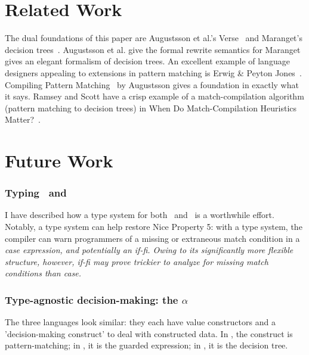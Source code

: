 \documentclass[manuscript,screen,review, 12pt, nonacm]{acmart}
\begin{document}
    \section{Related Work}

    The dual foundations of this paper are Augustsson et al.'s
    Verse~\citep{verse} and Maranget's decision trees~\citep{maranget}.
    Augustsson et al. give the formal rewrite semantics for \VC\; Maranget gives
    an elegant formalism of decision trees. An excellent example of language
    designers appealing to extensions in pattern matching is Erwig \&
    Peyton Jones~\citep{guardproposal}. Compiling Pattern
    Matching~\citep{augustsson1985compiling} by Augustsson gives a foundation in
    exactly what it says. Ramsey and Scott have a crisp example of a
    match-compilation algorithm (pattern matching to decision trees) in When Do
    Match-Compilation Heuristics Matter?~\citep{scottramsey}. 
    
    \section{Future Work}        
    \label{futurework}
        \subsubsection{Typing \PPlus\ and \VMinus}
        \label{typingppandvm}

        I have described how a type system for both \PPlus\ and \VMinus\ is a
        worthwhile effort. Notably, a type system can help restore Nice Property
        5: with a type system, the compiler can warn programmers of a missing or
        extraneous match condition in a \it{case} expression, and potentially an
        \it{if-fi}. Owing to its significantly more flexible structure, however,
        \it{if-fi} may prove trickier to analyze for missing match conditions
        than \it{case}.

        \subsubsection{Type-agnostic decision-making: the $\alpha$}
        \label{alphas}

        The three languages look similar: they each have value constructors and
        a 'decision-making construct' to deal with constructed data. In \PPlus, the
        construct is pattern-matching; in \VMinus, it is the guarded expression; in \D,
        it is the decision tree. 
\end{document}
